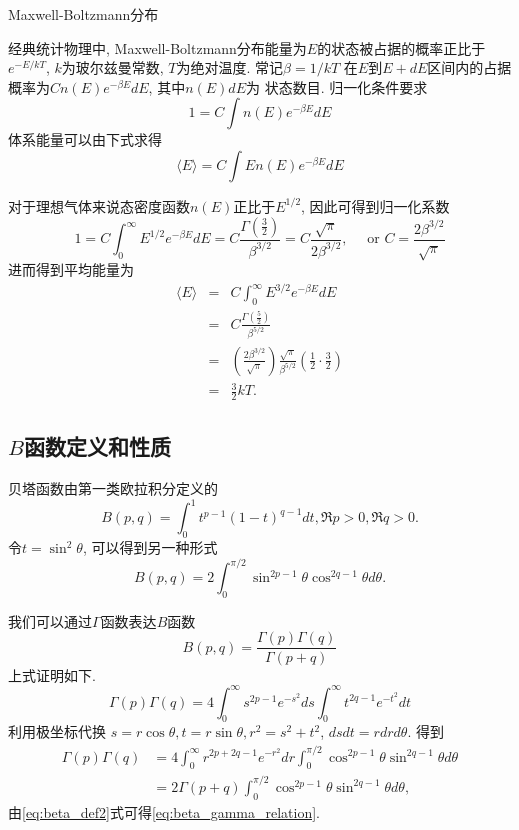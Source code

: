 \begin{example}
Maxwell-Boltzmann分布
\end{example}
\begin{solution}
    经典统计物理中, Maxwell-Boltzmann分布能量为$E$的状态被占据的概率正比于
    $e^{-E/kT}$, $k$为玻尔兹曼常数, $T$为绝对温度. 常记$\beta=1 / k T$
    在$E$到$E+dE$区间内的占据概率为$C n(E) e^{-\beta E} dE$, 其中$n(E)dE$为
    状态数目. 归一化条件要求
    $$
    1=C \int n(E) e^{-\beta E} d E
    $$
    体系能量可以由下式求得
    $$
    \langle E\rangle=C \int E n(E) e^{-\beta E} d E
    $$


    对于理想气体来说态密度函数$n(E)$正比于$E^{1/2}$, 因此可得到归一化系数
    $$
    1=C \int_0^{\infty} E^{1 / 2} e^{-\beta E} d E=C \frac{\Gamma\left(\frac{3}{2}\right)}{\beta^{3 / 2}}=C \frac{\sqrt{\pi}}{2 \beta^{3 / 2}}, \quad \text { or } C=\frac{2 \beta^{3 / 2}}{\sqrt{\pi}}
    $$
    进而得到平均能量为
    \begin{eqnarray*}
        \langle E\rangle
        &=&C \int_{0}^{\infty} E^{3 / 2} e^{-\beta E} d E 
        \\
        &=&C \frac{\Gamma\left(\frac{5}{2}\right)}{\beta^{5 / 2}}
        \\
        &=&\left(\frac{2 \beta^{3 / 2}}{\sqrt{\pi}}\right) 
        \frac{\sqrt{\pi}}{\beta^{5 / 2}}\left(\frac{1}{2} \cdot \frac{3}{2}\right)
        \\
        &=&\frac{3}{2} k T.
    \end{eqnarray*}
\end{solution}

\subsection{$B$函数定义和性质}
贝塔函数由第一类欧拉积分定义的
\begin{equation}
    B(p, q) = \int_0^1 t^{p -1} (1-t)^{q-1} dt, \Re p> 0, \Re q >0.
    \label{eq:beta_def1}
\end{equation}
令$t=\sin^2{\theta}$, 可以得到另一种形式
\begin{equation}
    B(p, q)  = 2\int_{0}^{\pi/2} \sin ^{2p -1}{\theta} \cos^{2q -1}{\theta} d\theta.
    \label{eq:beta_def2}
\end{equation}

我们可以通过$\Gamma$函数表达$B$函数
\begin{equation}
B(p, q)=\frac{\Gamma(p) \Gamma(q)}{\Gamma(p+q)}
\label{eq:beta_gamma_relation}
\end{equation}
上式证明如下.
$$
\Gamma(p) \Gamma(q)=4 \int_{0}^{\infty} s^{2 p-1} e^{-s^{2}} d s \int_{0}^{\infty} t^{2 q-1} e^{-t^{2}} d t
$$
利用极坐标代换
 $s=r \cos \theta, t=r \sin \theta, r^{2}=s^{2}+t^{2}$,  $d s d t=r d r d \theta$.
 得到
 $$
 \begin{aligned}
 \Gamma(p) \Gamma(q) & =4 \int_{0}^{\infty} r^{2 p+2 q-1} e^{-r^{2}} d r \int_{0}^{\pi / 2} \cos ^{2 p-1} \theta \sin ^{2 q-1} \theta d \theta \\
 & =2 \Gamma(p+q) \int_{0}^{\pi / 2} \cos ^{2 p-1} \theta \sin ^{2 q-1} \theta d \theta,
 \end{aligned}
 $$
 由\eqref{eq:beta_def2}式可得\eqref{eq:beta_gamma_relation}.

